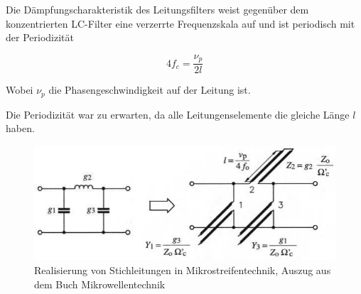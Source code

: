 Die  D\"ampfungscharakteristik  des   Leitungsfilters  weist  gegen\"uber  dem
konzentrierten  LC-Filter eine verzerrte Frequenzskala auf und ist  periodisch
mit der Periodizit\"at

\begin{equation}
    4f_c = \frac{\nu_p}{2l}
\end{equation}

Wobei $\nu_p$ die Phasengeschwindigkeit auf der Leitung ist.

Die Periodizit\"at war  zu  erwarten,  da  alle Leitungenselemente die gleiche
L\"ange $l$ haben.

\begin{figure}[h!]
    \centering
    \includegraphics[width=\imagewidth]{images/LC-zu-Leitungsfilter}
    \caption{Realisierung von Stichleitungen in Mikrostreifentechnik, Auszug aus dem Buch Mikrowellentechnik\cite[p.~26]{ref:baechold}}
    \label{fig:LC-zu-Leitungsfilter}
\end{figure}

